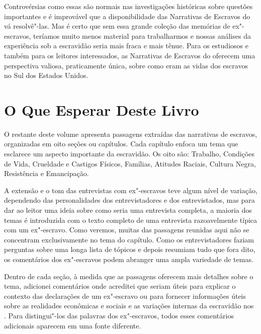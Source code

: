 Controvérsias como essas são normais nas investigações históricas sobre
questões importantes e é improvável que a disponibilidade das Narrativas
de Escravos do  vá resolvê"-las. Mas é certo que sem essa grande
coleção das memórias de ex"-escravos, teríamos muito menos material para
trabalharmos e nossas análises da experiência sob a escravidão seria
mais fraca e mais tênue. Para os estudiosos e também para os leitores
interessados, as Narrativas de Escravos do  oferecem uma perspectiva
valiosa, praticamente única, sobre como eram as vidas dos escravos no
Sul dos Estados Unidos.

\section{O Que Esperar Deste Livro}

O restante deste volume apresenta passagens extraídas das narrativas de
escravos, organizadas em oito seções ou capítulos. Cada capítulo enfoca
um tema que esclarece um aspecto importante da escravidão. Os oito são:
Trabalho, Condições de Vida, Crueldade e Castigos Físicos, Famílias,
Atitudes Raciais, Cultura Negra, Resistência e Emancipação.

A extensão e o tom das entrevistas com ex"-escravos teve algum nível de
variação, dependendo das personalidades dos entrevistadores e dos
entrevistados, mas para dar ao leitor uma ideia sobre como seria uma
entrevista completa, a maioria dos temas é introduzida com o texto
completo de uma entrevista razoavelmente típica com um ex"-escravo. Como
veremos, muitas das passagens reunidas aqui não se concentram
exclusivamente no tema do capítulo. Como os entrevistadores faziam
perguntas sobre uma longa lista de tópicos e depois resumiam tudo que
fora dito, os comentários dos ex"-escravos podem abranger uma ampla
variedade de temas.

Dentro de cada seção, à medida que as passagens oferecem mais detalhes
sobre o tema, adicionei comentários onde acreditei que seriam úteis para
explicar o contexto das declarações de um ex"-escravo ou para fornecer
informações úteis sobre as realidades econômicas e sociais e as
variações internas da escravidão nos . Para distingui"-los das
palavras dos ex"-escravos, todos esses comentários adicionais aparecem em
uma fonte diferente.